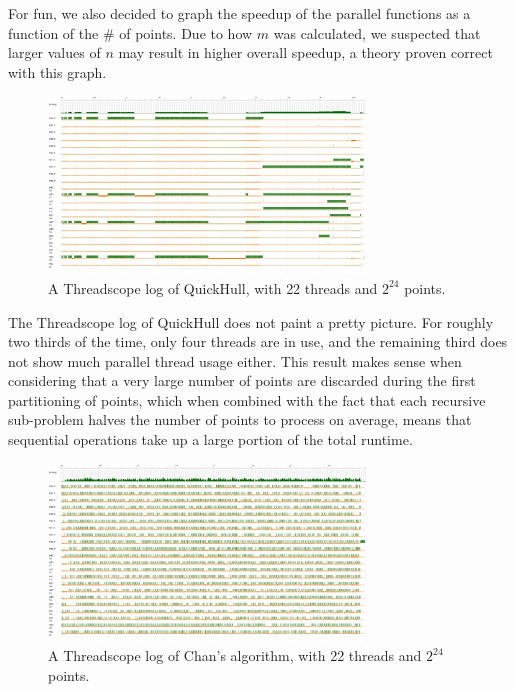 \documentclass[12pt]{article}
\begin{document}
    For fun, we also decided to graph the speedup of the parallel functions as a function of the \# of points. Due to how $m$ was calculated, we suspected that larger values of $n$ may result in higher overall speedup, a theory proven correct with this graph.

    \newpage

    \begin{figure}[h]
      \centering
      \includegraphics[width=0.75\textwidth]{quickhull2par_threadscope.png}
      \caption{A Threadscope log of QuickHull, with 22 threads and $2^{24}$ points.}
    \end{figure}

    The Threadscope log of QuickHull does not paint a pretty picture. For roughly two thirds of the time, only four threads are in use, and the remaining third does not show much parallel thread usage either. This result makes sense when considering that a very large number of points are discarded during the first partitioning of points, which when combined with the fact that each recursive sub-problem halves the number of points to process on average, means that sequential operations take up a large portion of the total runtime.

    \newpage

    \begin{figure}[h]
      \centering
      \includegraphics[width=0.75\textwidth]{chans2par_threadscope.png}
      \caption{A Threadscope log of Chan's algorithm, with 22 threads and $2^{24}$ points.}
    \end{figure}
\end{document}
